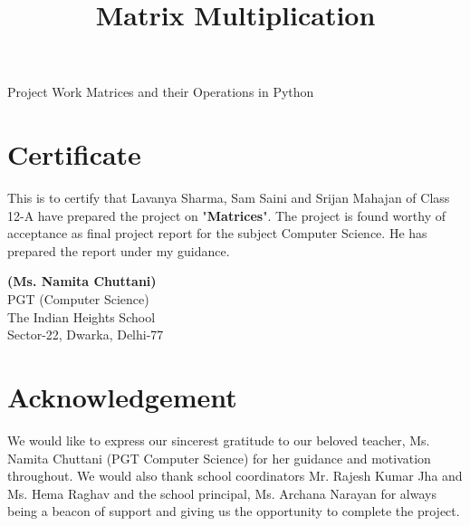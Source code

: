 


\lstset{style=mystyle}
\title{Matrix Multiplication}


\begin{titlepage}
	\begin{center}
		\huge Project Work \vfil
		Matrices and their Operations in Python\\

	\end{center}
\end{titlepage}
\tableofcontents
\newpage
\section*{Certificate}
This is to certify that Lavanya Sharma, Sam Saini and Srijan Mahajan of Class 12-A have prepared the project on "\textbf{Matrices}". The project is found worthy of acceptance as final project report for the subject Computer Science. He has prepared the report under my guidance.
\vfill
\begin{flushright}
	\textbf{(Ms. Namita Chuttani)}\\
	PGT (Computer Science)\\
	The Indian Heights School\\
	Sector-22, Dwarka, Delhi-77
\end{flushright}
\newpage
\section*{Acknowledgement}
We would like to express our sincerest gratitude to our beloved teacher, Ms. Namita Chuttani (PGT Computer Science) for her guidance and motivation throughout. We would also thank school coordinators Mr. Rajesh Kumar Jha and Ms. Hema Raghav and the school principal, Ms. Archana Narayan for always being a beacon of support and giving us the opportunity to complete the project. 

